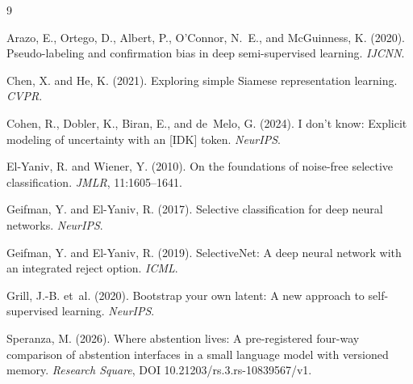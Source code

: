 \documentclass[11pt,a4paper]{article}
\begin{document}

\begin{thebibliography}{9}

Arazo, E., Ortego, D., Albert, P., O'Connor, N.~E., and McGuinness, K. (2020).
Pseudo-labeling and confirmation bias in deep semi-supervised learning.
\emph{IJCNN}.

Chen, X. and He, K. (2021).
Exploring simple Siamese representation learning.
\emph{CVPR}.

Cohen, R., Dobler, K., Biran, E., and de~Melo, G. (2024).
I don't know: Explicit modeling of uncertainty with an [IDK] token.
\emph{NeurIPS}.

El-Yaniv, R. and Wiener, Y. (2010).
On the foundations of noise-free selective classification.
\emph{JMLR}, 11:1605--1641.

Geifman, Y. and El-Yaniv, R. (2017).
Selective classification for deep neural networks.
\emph{NeurIPS}.

Geifman, Y. and El-Yaniv, R. (2019).
SelectiveNet: A deep neural network with an integrated reject option.
\emph{ICML}.

Grill, J.-B. et~al. (2020).
Bootstrap your own latent: A new approach to self-supervised learning.
\emph{NeurIPS}.

Speranza, M. (2026).
Where abstention lives: A pre-registered four-way comparison of abstention interfaces in a small
language model with versioned memory.
\emph{Research Square}, DOI 10.21203/rs.3.rs-10839567/v1.

\end{thebibliography}
\end{document}

